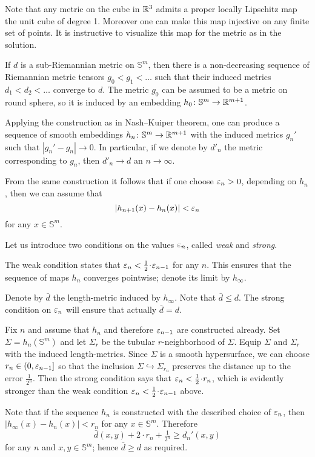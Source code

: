 Note that any metric on the cube in $\mathbb{R}^3$ admits a proper locally Lipschitz map the unit cube of degree 1.
Moreover one can make this map injective on any finite set of points.
It is instructive to visualize this map for the metric as in the solution.

If $d$ is a sub-Riemannian metric on $\mathbb{S}^m$,
then there is a non-decreasing sequence of Riemannian metric tensors
$g_0< g_1<\dots$ such that their induced metrics $d_1<d_2<\dots$ converge to $d$.
The metric $g_0$ can be assumed to be a metric on round sphere,
so it is induced by an embedding $h_0\colon\mathbb{S}^m\to \mathbb{R}^{m+1}$.

Applying the construction as in Nash--Kuiper theorem,
one can produce a sequence of smooth embeddings $h_n\colon\mathbb{S}^m\to \mathbb{R}^{m+1}$ with the induced metrics $g_n'$
such that $|g_n'-g_n|\to 0$.
In particular, if we denote by $d'_n$ the metric corresponding to $g_n$, then $d'_n\to d$ an $n\to\infty$.

From the same construction it follows that
if one choose $\varepsilon_n>0$, depending on $h_n$,
then we can assume that 
\[|h_{n+1}(x)-h_n(x)|<\varepsilon_n\] for any $x\in \mathbb{S}^m$.

Let us introduce two conditions on the values $\varepsilon_n$, called \emph{weak} and \emph{strong}.

The weak condition states that $\eps_{n}< \tfrac1{2}\cdot \eps_{n-1}$ for any $n$.
This ensures that the sequence of maps $h_n$ converges pointwise;
denote its limit by $h_\infty$.

Denote by $\bar d$ the length-metric induced by $h_\infty$.
Note that $\bar d\le d$.
The strong condition on $\varepsilon_n$ will ensure that actually $\bar d=d$.

Fix $n$ and assume that $h_n$ and therefore $\varepsilon_{n-1}$ are constructed already.
Set $\Sigma=h_n(\mathbb{S}^m)$
and let $\Sigma_r$ be the tubular $r$-neighborhood of $\Sigma$.
Equip $\Sigma$ and $\Sigma_r$ with the induced length-metrics.
Since $\Sigma$ is a smooth hypersurface, we can choose $r_n\in(0,\varepsilon_{n-1}]$ 
so that the inclusion $\Sigma\hookrightarrow \Sigma_{r_n}$ preserves the distance up to the error $\tfrac1{2^n}$.
Then the strong condition says that $\eps_n< \tfrac12\cdot r_n$, 
which is evidently stronger than the weak condition  $\eps_{n}< \tfrac1{2}\cdot \eps_{n-1}$ above.

Note that if the sequence $h_n$ is constructed with the described choice of $\varepsilon_n$,
then $|h_\infty(x)-h_n(x)|<r_n$ for any $x\in\mathbb{S}^m$.
Therefore 
\[\bar d(x,y)+2\cdot r_n+\tfrac1{2^n}\ge d_n'(x,y)\] 
for any $n$ and $x,y\in \mathbb{S}^m$;
hence $\bar d\ge d$ as required. 
\qeds


